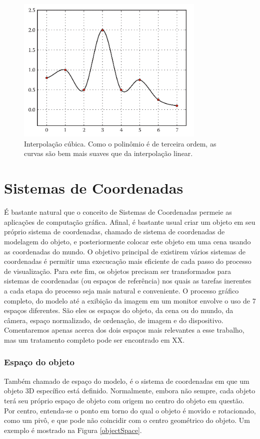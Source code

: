 \documentclass[12pt, a4paper, oneside]{book}
\begin{document}
\begin{figure}[!htb]
\center
\includegraphics[width=9cm]{cubic}
\caption{Interpolação cúbica. Como o polinômio é de terceira ordem, as curvas são bem mais suaves que da interpolação linear.}
\label{cubicInterp}
\end{figure}



\section{Sistemas de Coordenadas}

É bastante natural que o conceito de Sistemas de Coordenadas permeie as aplicações de computação gráfica. Afinal, é bastante usual criar um objeto em seu próprio sistema de coordenadas, chamado de sistema de coordenadas de modelagem do objeto, e posteriormente colocar este objeto em uma cena usando as coordenadas do mundo. O objetivo principal de existirem vários sistemas de coordenadas é permitir uma execucação mais eficiente de cada passo do processo de visualização. Para este fim, os objetos precisam ser transformados para sistemas de coordenadas (ou espaços de referência) nos quais as tarefas inerentes a cada etapa do processo seja mais natural e conveniente. O processo gráfico completo, do modelo até a exibição da imagem em um monitor envolve o uso de 7 espaços diferentes. São eles os espaços do objeto, da cena ou do mundo, da câmera, espaço normalizado, de ordenação, de imagem e do dispositivo. Comentaremos apenas acerca dos dois espaços mais relevantes a esse trabalho, mas um tratamento completo pode ser encontrado em XX.

\subsubsection{Espaço do objeto}
Também chamado de espaço do modelo, é o sistema de coordenadas em que um objeto 3D específico está definido. Normalmente, embora não sempre, cada objeto terá seu próprio espaço de objeto com origem no centro do objeto em questão. Por centro, entenda-se o ponto em torno do qual o objeto é movido e rotacionado, como um pivô, e que pode não coincidir com o centro geométrico do objeto. Um exemplo é mostrado na Figura \ref{objectSpace}.
\end{document}
